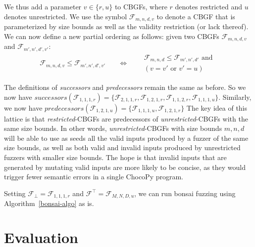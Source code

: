 \documentclass[conference]{IEEEtran}
\newcommand{\tech}{bonsai fuzzing} \newcommand{\Tech}{Bonsai fuzzing} \newcommand{\TECH}{Bonsai Fuzzing}
\begin{document}
We thus add a parameter $v \in \{r, u\}$ to CBGFs, where $r$ denotes restricted and $u$ denotes unrestricted. We use the symbol $\mathscr{F}_{m,n,d,v}$ to denote a CBGF that is parameterized by size bounds as well as the validity restriction (or lack thereof). We can now define a new partial ordering as follows: given two CBGFs $\mathscr{F}_{m, n, d, v}$ and $\mathscr{F}_{m', n', d', v'}$:
\begin{align*}
    \mathscr{F}_{m, n, d, v} \le \mathscr{F}_{m', n', d', v'} \quad &\Longleftrightarrow
    \begin{aligned}\quad & \mathcal{F}_{m, n, d} \le \mathcal{F}_{m', n', d'} \text{ and } \\ 
        & (v = v' \text{ or } v' = u)
    \end{aligned}\end{align*}

The definitions of \emph{successors} and \emph{predecessors} remain the same as before. So we now have
$\mathit{successors}(\mathscr{F}_{1,1,1,r}) = \{\mathscr{F}_{2,1,1,r}, \mathscr{F}_{1,2,1,r}, \mathscr{F}_{1,1,2,r}, \mathscr{F}_{1,1,1,u}\}$. Similarly, we now have $\mathit{predecessors}(\mathscr{F}_{1,2,1,u}) = \{\mathscr{F}_{1,1,1,u}, \mathscr{F}_{1,2,1,r}\}$
The key idea of this lattice is that \textit{restricted}-CBGFs are predecessors of \textit{unrestricted}-CBGFs with the same size bounds. In other words, \textit{unrestricted}-CBGFs with size bounds $m,n,d$ will be able to use as seeds all the valid inputs produced by a fuzzer of the same size bounds, as well as both valid and invalid inputs produced by unrestricted fuzzers with smaller size bounds. The hope is that invalid inputs that are generated by mutating valid inputs are more likely to be concise, as they would trigger fewer semantic errors in a single ChocoPy program.

Setting $\mathscr{F}_{\bot} = \mathscr{F}_{1,1,1,r}$ and $\mathscr{F}^{\top} = \mathscr{F}_{M,N,D,u}$, we can run \tech{} using Algorithm~\ref{bonsai-algo} as is.
 \section{Evaluation}
\label{sec:eval}
\end{document}

